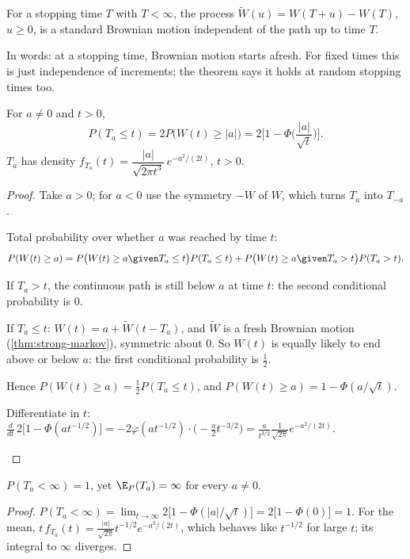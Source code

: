 \begin{theorem}
\label{thm:strong-markov}
For a stopping time $T$ with $T<\infty$, the process $\tilde W(u)=W(T+u)-W(T)$, $u\ge0$, is a standard Brownian motion independent of the path up to time $T$.
\end{theorem}
\noproof

In words: at a stopping time, Brownian motion starts afresh. For fixed times this is just independence of increments; the theorem says it holds at random stopping times too.

\begin{theorem}[Distribution of $T_a$]
\label{thm:Ta}
For $a\ne0$ and $t>0$,
\[
  P(T_a\le t)=2P\big(W(t)\ge|a|\big)=2\Big[1-\Phi\Big(\frac{|a|}{\sqrt t}\Big)\Big].
\]
$T_a$ has density $f_{T_a}(t)=\dfrac{|a|}{\sqrt{2\pi t^3}}\,e^{-a^2/(2t)}$, $t>0$.
\end{theorem}
\begin{proof}
Take $a>0$; for $a<0$ use the symmetry $-W$ of $W$, which turns $T_a$ into $T_{-a}$.
\begin{steps}
  \item Total probability over whether $a$ was reached by time $t$:
  \[
    P(W(t)\ge a)=P\big(W(t)\ge a\given T_a\le t\big)P(T_a\le t)+P\big(W(t)\ge a\given T_a>t\big)P(T_a>t).
  \]
  \item If $T_a>t$, the continuous path is still below $a$ at time $t$: the second conditional probability is $0$.
  \item If $T_a\le t$: $W(t)=a+\tilde W(t-T_a)$, and $\tilde W$ is a fresh Brownian motion (\cref{thm:strong-markov}), symmetric about $0$. So $W(t)$ is equally likely to end above or below $a$: the first conditional probability is $\frac12$.
  \item Hence $P(W(t)\ge a)=\frac12P(T_a\le t)$, and $P(W(t)\ge a)=1-\Phi(a/\sqrt t)$.
  \item Differentiate in $t$: $\frac{d}{dt}\,2\big[1-\Phi(at^{-1/2})\big]=-2\varphi(at^{-1/2})\cdot\big(-\frac a2t^{-3/2}\big)=\frac{a}{t^{3/2}}\frac{1}{\sqrt{2\pi}}e^{-a^2/(2t)}$. \qedhere
\end{steps}
\end{proof}

\begin{result}
\label{res:Ta-finite}
$P(T_a<\infty)=1$, yet $\E_P(T_a)=\infty$ for every $a\ne0$.
\end{result}
\begin{proof}
$P(T_a<\infty)=\lim_{t\to\infty}2\big[1-\Phi(|a|/\sqrt t)\big]=2\big[1-\Phi(0)\big]=1$. For the mean, $t\,f_{T_a}(t)=\frac{|a|}{\sqrt{2\pi}}t^{-1/2}e^{-a^2/(2t)}$, which behaves like $t^{-1/2}$ for large $t$; its integral to $\infty$ diverges.
\end{proof}

